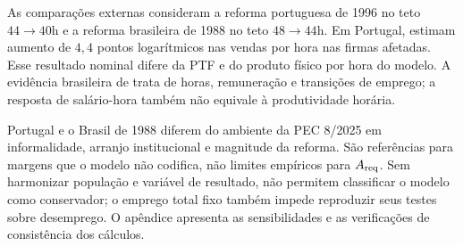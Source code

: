 As comparações externas consideram a reforma portuguesa de 1996 no teto $44\to40$h e a reforma brasileira de 1988 no teto $48\to44$h. Em Portugal, \citet{AsaiLopesTondini2024} estimam aumento de $4{,}4$ pontos logarítmicos nas vendas por hora nas firmas afetadas. Esse resultado nominal difere da PTF e do produto físico por hora do modelo. A evidência brasileira de \citet{GonzagaMenezesFilhoCamargo2003} trata de horas, remuneração e transições de emprego; a resposta de salário-hora também não equivale à produtividade horária.

Portugal e o Brasil de 1988 diferem do ambiente da PEC 8/2025 em informalidade, arranjo institucional e magnitude da reforma. São referências para margens que o modelo não codifica, não limites empíricos para $A_{\mathrm{req}}$. Sem harmonizar população e variável de resultado, não permitem classificar o modelo como conservador; o emprego total fixo também impede reproduzir seus testes sobre desemprego. O apêndice apresenta as sensibilidades e as verificações de consistência dos cálculos.

